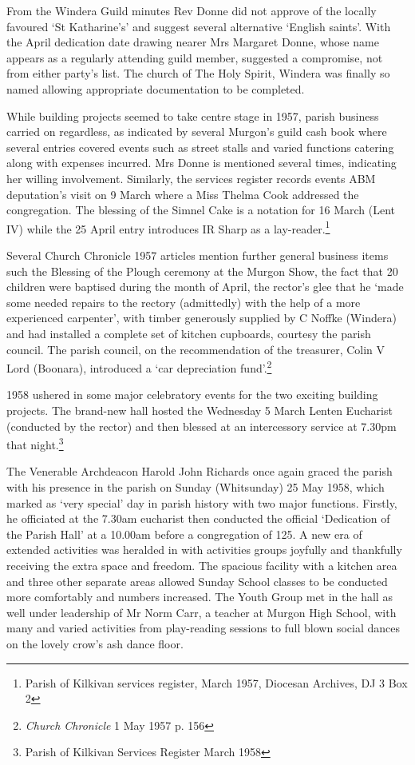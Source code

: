 From the Windera Guild minutes Rev Donne did not approve of the locally
favoured `St Katharine's' and suggest several alternative `English
saints'. With the April dedication date drawing nearer Mrs Margaret
Donne, whose name appears as a regularly attending guild member,
suggested a compromise, not from either party's list. The church of The
Holy Spirit, Windera was finally so named allowing appropriate
documentation to be completed.

While building projects seemed to take centre stage in 1957, parish
business carried on regardless, as indicated by several Murgon's guild
cash book where several entries covered events such as street stalls and
varied functions catering along with expenses incurred. Mrs Donne is
mentioned several times, indicating her willing involvement. Similarly,
the services register records events ABM deputation's visit on 9 March
where a Miss Thelma Cook addressed the congregation. The blessing of the
Simnel Cake is a notation for 16 March (Lent IV) while the 25 April
entry introduces IR Sharp as a lay-reader.\footnote{Parish of Kilkivan
  services register, March 1957, Diocesan Archives, DJ 3 Box 2}

Several Church Chronicle 1957 articles mention further general business
items such the Blessing of the Plough ceremony at the Murgon Show, the
fact that 20 children were baptised during the month of April, the
rector's glee that he `made some needed repairs to the rectory
(admittedly) with the help of a more experienced carpenter', with timber
generously supplied by C Noffke (Windera) and had installed a complete
set of kitchen cupboards, courtesy the parish council. The parish
council, on the recommendation of the treasurer, Colin V Lord (Boonara),
introduced a `car depreciation fund'.\footnote{\emph{Church Chronicle} 1
  May 1957 p. 156}

1958 ushered in some major celebratory events for the two exciting
building projects. The brand-new hall hosted the Wednesday 5 March
Lenten Eucharist (conducted by the rector) and then blessed at an
intercessory service at 7.30pm that night.\footnote{Parish of Kilkivan
  Services Register March 1958}

The Venerable Archdeacon Harold John Richards once again graced the
parish with his presence in the parish on Sunday (Whitsunday) 25 May
1958, which marked as `very special' day in parish history with two
major functions. Firstly, he officiated at the 7.30am eucharist then
conducted the official `Dedication of the Parish Hall' at a 10.00am
before a congregation of 125. A new era of extended activities was
heralded in with activities groups joyfully and thankfully receiving the
extra space and freedom. The spacious facility with a kitchen area and
three other separate areas allowed Sunday School classes to be conducted
more comfortably and numbers increased. The Youth Group met in the hall
as well under leadership of Mr Norm Carr, a teacher at Murgon High
School, with many and varied activities from play-reading sessions to
full blown social dances on the lovely crow's ash dance floor.

